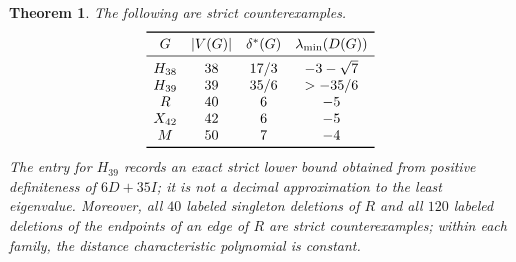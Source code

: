 \documentclass[a4paper,10pt,reqno]{amsart}
\theoremstyle{plain}
\newtheorem{theorem}{Theorem}[section]
\theoremstyle{definition}
\theoremstyle{remark}
\begin{document}
\begin{theorem}\label{thm:explicit-examples}
The following are strict counterexamples.
\[
\begin{array}{c@{\quad}c@{\quad}c@{\quad}c}
\toprule
G&|V(G)|&\delta^*(G)&\lambda_{\min}(D(G))\\
\midrule
H_{38}&38&17/3&-3-\sqrt7\\
H_{39}&39&35/6&>-35/6\\
R&40&6&-5\\
X_{42}&42&6&-5\\
M&50&7&-4\\
\bottomrule
\end{array}
\]
The entry for \(H_{39}\) records an exact strict lower bound obtained from
positive definiteness of \(6D+35I\); it is not a decimal approximation to the
least eigenvalue.  Moreover, all \(40\) labeled singleton deletions of \(R\)
and all \(120\) labeled deletions of the endpoints of an edge of \(R\) are
strict counterexamples; within each family, the distance characteristic
polynomial is constant.
\end{theorem}
\end{document}
